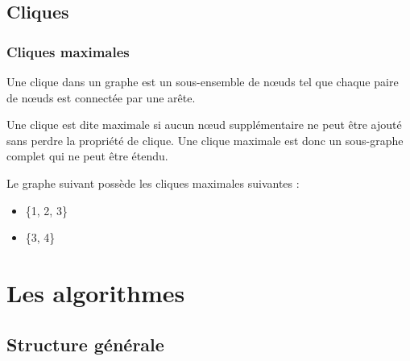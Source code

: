 \documentclass{beamer}
\begin{document}
\subsection{Cliques}
\begin{frame}
  \frametitle{Cliques maximales}
  \begin{definition}
    Une clique dans un graphe est un sous-ensemble de nœuds tel que chaque paire de nœuds est connectée par une arête.
  \end{definition}
  \begin{definition}
    Une clique est dite maximale si aucun nœud supplémentaire ne peut être ajouté sans perdre la propriété de clique. Une clique maximale est donc un sous-graphe complet qui ne peut être étendu.
  \end{definition}
  \begin{example}
    \begin{multicols}{2}
      Le graphe suivant possède les cliques maximales suivantes :
      \begin{itemize}
        \item \{1, 2, 3\}
        \item \{3, 4\}
      \end{itemize}
      \begin{figure}
        \centering
      \end{figure}
    \end{multicols}
  \end{example}
\end{frame}

\section{Les algorithmes}
\subsection{Structure générale}%
\label{subsec:struct}
\end{document}
